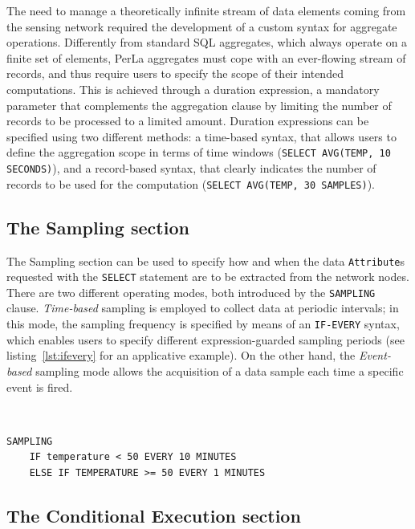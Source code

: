 The need to manage a theoretically infinite stream of data elements coming from
the sensing network required the development of a custom syntax for aggregate
operations. Differently from standard SQL aggregates, which always operate on a
finite set of elements, PerLa aggregates must cope with an ever-flowing stream
of records, and thus require users to specify the scope of their intended
computations. This is achieved through a duration expression, a mandatory
parameter that complements the aggregation clause by limiting the number of
records to be processed to a limited amount. Duration expressions can be
specified using two different methods: a time-based syntax, that allows users
to define the aggregation scope in terms of time windows (\lstinline!SELECT AVG(TEMP, 10 SECONDS)!),
and a record-based syntax, that clearly indicates the
number of records to be used for the computation (\lstinline!SELECT AVG(TEMP, 30 SAMPLES)!).

\subsection{The Sampling section}

The Sampling section can be used to specify how and when the data
\texttt{Attribute}s requested with the \texttt{SELECT} statement are to be
extracted from the network nodes. There are two different operating modes, both
introduced by the \texttt{SAMPLING} clause. \textit{Time-based} sampling is
employed to collect data at periodic intervals; in this mode, the sampling
frequency is specified by means of an \texttt{IF-EVERY} syntax, which enables
users to specify different expression-guarded sampling periods (see
listing~\ref{lst:ifevery} for an applicative example). On the other hand, the
\textit{Event-based} sampling mode allows the acquisition of a data sample each
time a specific event is fired.

~\\
\begin{lstlisting}[label={lst:ifevery},caption={An example of time-based sampling, which shows how
the sampling frequency can be increased as the monitored phenomenon evolves.}]
SAMPLING
    IF temperature < 50 EVERY 10 MINUTES
    ELSE IF TEMPERATURE >= 50 EVERY 1 MINUTES
\end{lstlisting}

\subsection{The Conditional Execution section}

